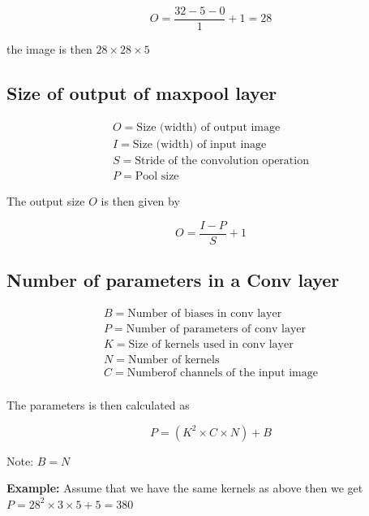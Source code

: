 \begin{equation*}
    O = \frac{32 - 5 - 0}{1} + 1 = 28
\end{equation*}

the image is then $28 \times 28 \times 5$

\subsection{Size of output of maxpool layer}

\begin{gather*}
    O = \text{Size (width) of output image} \\
    I = \text{Size (width) of input inage} \\
    S = \text{Stride of the convolution operation} \\
    P = \text{Pool size}
\end{gather*}

The output size $O$ is then given by 

\begin{equation*}
    O = \frac{I - P}{S} + 1
\end{equation*}

\subsection{Number of parameters in a Conv layer}

\begin{gather*}
    B = \text{Number of biases in conv layer} \\
    P = \text{Number of parameters of conv layer} \\
    K = \text{Size of kernels used in conv layer} \\
    N = \text{Number of kernels} \\
    C = \text{Numberof channels of the input image} \\
\end{gather*}

The parameters is then calculated as

\begin{equation*}
    P = (K^2 \times C \times N) + B
\end{equation*}

Note: $B = N$ 

\textbf{Example:} Assume that we have the same kernels as above then we get
$P = 28^2 \times 3 \times 5 + 5 = 380$


